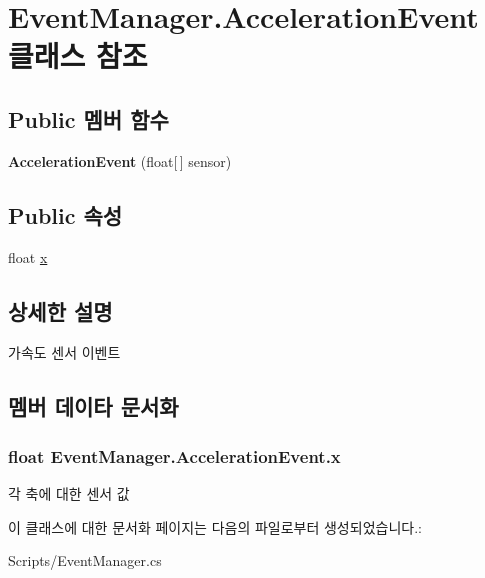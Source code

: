 \hypertarget{class_event_manager_1_1_acceleration_event}{}\section{Event\+Manager.\+Acceleration\+Event 클래스 참조}
\label{class_event_manager_1_1_acceleration_event}
\subsection*{Public 멤버 함수}
\begin{DoxyCompactItemize}
\item 
\hypertarget{class_event_manager_1_1_acceleration_event_ad18230460e27b3d1a3fb9ffb2d8d8618}{}{\bfseries Acceleration\+Event} (float\mbox{[}$\,$\mbox{]} sensor)\label{class_event_manager_1_1_acceleration_event_ad18230460e27b3d1a3fb9ffb2d8d8618}

\end{DoxyCompactItemize}
\subsection*{Public 속성}
\begin{DoxyCompactItemize}
\item 
float \hyperlink{class_event_manager_1_1_acceleration_event_afdd30cea9eb3291ff85f059a8ec52969}{x}
\end{DoxyCompactItemize}


\subsection{상세한 설명}
가속도 센서 이벤트 

\subsection{멤버 데이타 문서화}
\hypertarget{class_event_manager_1_1_acceleration_event_afdd30cea9eb3291ff85f059a8ec52969}{}
\subsubsection[{x}]{\setlength{\rightskip}{0pt plus 5cm}float Event\+Manager.\+Acceleration\+Event.\+x}\label{class_event_manager_1_1_acceleration_event_afdd30cea9eb3291ff85f059a8ec52969}
각 축에 대한 센서 값 

이 클래스에 대한 문서화 페이지는 다음의 파일로부터 생성되었습니다.\+:\begin{DoxyCompactItemize}
\item 
Scripts/Event\+Manager.\+cs\end{DoxyCompactItemize}
